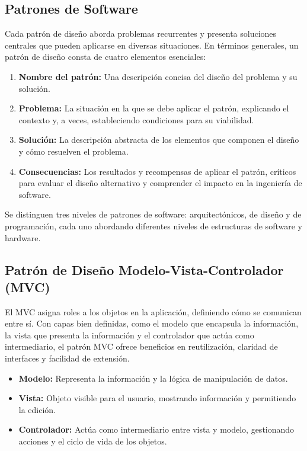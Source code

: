 \documentclass[11pt, twocolumn]{article}
\begin{document}
  \subsection*{Patrones de Software}
  Cada patrón de diseño aborda problemas recurrentes y presenta soluciones centrales que pueden aplicarse en diversas situaciones. En términos generales, un patrón de diseño consta de cuatro elementos esenciales:

  \begin{enumerate}
    \item \textbf{Nombre del patrón:} Una descripción concisa del diseño del problema y su solución.
    \item \textbf{Problema:} La situación en la que se debe aplicar el patrón, explicando el contexto y, a veces, estableciendo condiciones para su viabilidad.
    \item \textbf{Solución:} La descripción abstracta de los elementos que componen el diseño y cómo resuelven el problema.
    \item \textbf{Consecuencias:} Los resultados y recompensas de aplicar el patrón, críticos para evaluar el diseño alternativo y comprender el impacto en la ingeniería de software.
  \end{enumerate}
  
  Se distinguen tres niveles de patrones de software: arquitectónicos, de diseño y de programación, cada uno abordando diferentes niveles de estructuras de software y hardware.

  \subsection*{Patrón de Diseño Modelo-Vista-Controlador (MVC)}
  El MVC asigna roles a los objetos en la aplicación, definiendo cómo se comunican entre sí. Con capas bien definidas, como el modelo que encapsula la información, la vista que presenta la información y el controlador que actúa como intermediario, el patrón MVC ofrece beneficios en reutilización, claridad de interfaces y facilidad de extensión.

  \begin{itemize}
    \item \textbf{Modelo:} Representa la información y la lógica de manipulación de datos.
    \item \textbf{Vista:} Objeto visible para el usuario, mostrando información y permitiendo la edición.
    \item \textbf{Controlador:} Actúa como intermediario entre vista y modelo, gestionando acciones y el ciclo de vida de los objetos.
  \end{itemize}
\end{document}
